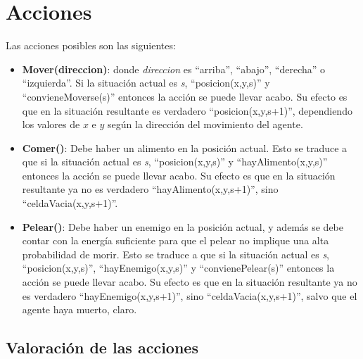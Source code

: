 \section{Acciones}

Las acciones posibles son las siguientes:


\begin{itemize}

\item \textbf{Mover(direccion)}: donde \emph{direccion} es ``arriba'',
``abajo'', ``derecha'' o ``izquierda''. Si la situación actual es \emph{s},
``posicion(x,y,s)'' y ``convieneMoverse(s)'' entonces la acción se puede llevar
acabo. Su efecto es que en la situación resultante es verdadero
``posicion(x,y,s+1)'', dependiendo los valores de $x$ e $y$ según la dirección
del movimiento del agente.

\item \textbf{Comer()}: Debe haber un alimento en la posición actual. Esto se
traduce a que si la situación actual es \emph{s}, ``posicion(x,y,s)'' y
``hayAlimento(x,y,s)'' entonces la acción se puede llevar acabo. Su efecto es
que en la situación resultante ya no es verdadero ``hayAlimento(x,y,s+1)'',
sino ``celdaVacia(x,y,s+1)''.

\item \textbf{Pelear()}: Debe haber un enemigo en la posición actual, y además
se debe contar con la energía suficiente para que el pelear no implique una
alta probabilidad de morir. Esto se traduce a que si la situación actual es
\emph{s}, ``posicion(x,y,s)'', ``hayEnemigo(x,y,s)'' y ``convienePelear(s)''
entonces la acción se puede llevar acabo. Su efecto es que en la situación
resultante ya no es verdadero ``hayEnemigo(x,y,s+1)'', sino
``celdaVacia(x,y,s+1)'', salvo que el agente haya muerto, claro.

\end{itemize}

\subsection{Valoración de las acciones}

